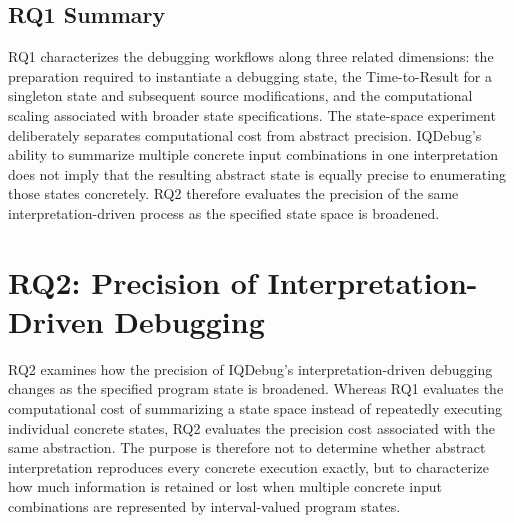 \documentclass[11pt,oneside]{report}
\theoremstyle{plain}
\theoremstyle{definition}
\theoremstyle{remark}
\begin{document}
\subsection{RQ1 Summary}
\label{subsec:eval:rq1:summary}

RQ1 characterizes the debugging workflows along three related dimensions: the preparation required to instantiate a debugging state, the Time-to-Result for a singleton state and subsequent source modifications, and the computational scaling associated with broader state specifications. The state-space experiment deliberately separates computational cost from abstract precision. IQDebug's ability to summarize multiple concrete input combinations in one interpretation does not imply that the resulting abstract state is equally precise to enumerating those states concretely. RQ2 therefore evaluates the precision of the same interpretation-driven process as the specified state space is broadened.



\section{RQ2: Precision of Interpretation-Driven Debugging}
\label{sec:eval:rq2}

RQ2 examines how the precision of IQDebug's interpretation-driven debugging changes as the specified program state is broadened. Whereas RQ1 evaluates the computational cost of summarizing a state space instead of repeatedly executing individual concrete states, RQ2 evaluates the precision cost associated with the same abstraction. The purpose is therefore not to determine whether abstract interpretation reproduces every concrete execution exactly, but to characterize how much information is retained or lost when multiple concrete input combinations are represented by interval-valued program states.
\end{document}
